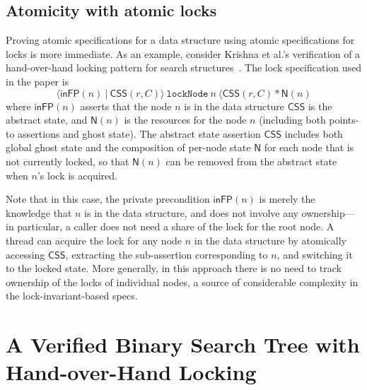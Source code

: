\documentclass[runningheads]{llncs}
\begin{document}
\subsection{Atomicity with atomic locks}
Proving atomic specifications for a data structure using atomic specifications for locks is more immediate. As an example, consider Krishna et al.'s verification of a hand-over-hand locking pattern for search structures~\cite{templates}. The lock specification used in the paper is $$\langle \mathsf{inFP}(n)\ |\ \mathsf{CSS}(r, C) \rangle\ \mathtt{lockNode}\ n\ \langle \mathsf{CSS}(r, C) * \mathsf{N}(n)$$ where $\mathsf{inFP}(n)$ asserts that the node $n$ is in the data structure $\mathsf{CSS}$ is the abstract state, and $\mathsf{N}(n)$ is the resources for the node $n$ (including both points-to assertions and ghost state). The abstract state assertion $\mathsf{CSS}$ includes both global ghost state and the composition of per-node state $\mathsf{N}$ for each node that is not currently locked, so that $\mathsf{N}(n)$ can be removed from the abstract state when $n$'s lock is acquired.

Note that in this case, the private precondition $\mathsf{inFP}(n)$ is merely the knowledge that $n$ is in the data structure, and does not involve any ownership---in particular, a caller does not need a share of the lock for the root node. A thread can acquire the lock for any node $n$ in the data structure by atomically accessing $\mathsf{CSS}$, extracting the sub-assertion corresponding to $n$, and switching it to the locked state. More generally, in this approach there is no need to track ownership of the locks of individual nodes, a source of considerable complexity in the lock-invariant-based specs. %

\section{A Verified Binary Search Tree with Hand-over-Hand Locking}
\label{hand-over-hand}
\end{document}

